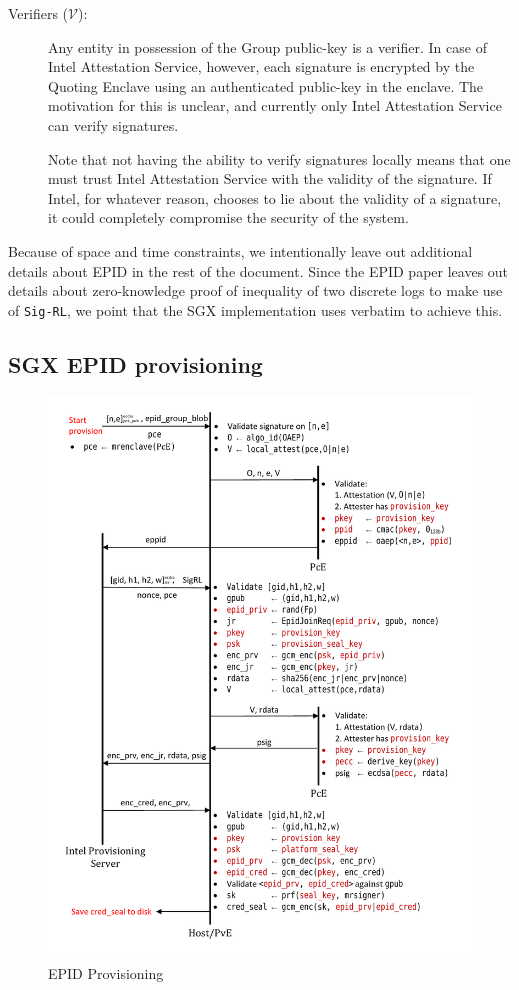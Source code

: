 \documentclass[letterpaper]{article}
\begin{document}
\begin{description}
    \item [Verifiers ($\mathcal{V}$):] Any entity in possession of the
      Group public-key is a verifier. In case of Intel Attestation
      Service, however, each signature is encrypted by the
      \textsf{Quoting Enclave} using an authenticated public-key in
      the enclave. The motivation for this is unclear, and currently
      only Intel Attestation Service can verify signatures.

      Note that not having the ability to verify signatures locally
      means that one must trust Intel Attestation Service with the
      validity of the signature. If Intel, for whatever reason,
      chooses to lie about the validity of a signature, it could
      completely compromise the security of the system.
  \end{description}

  Because of space and time constraints, we intentionally leave out
  additional details about EPID in the rest of the document. Since the
  EPID paper leaves out details about zero-knowledge proof of
  inequality of two discrete logs to make use of \texttt{Sig-RL}, we
  point that the SGX implementation uses \cite[\S6]{ShoupVFE} verbatim
  to achieve this.

  \subsection{SGX EPID provisioning}
  \label{ssec:epidprov}
  \begin{figure}
  \centering
  \includegraphics[width=0.8\linewidth]{Diagrams/EpidProvisioning}
  \caption{EPID Provisioning}
  \label{fig:epidprov}
  \end{figure}
\end{document}
